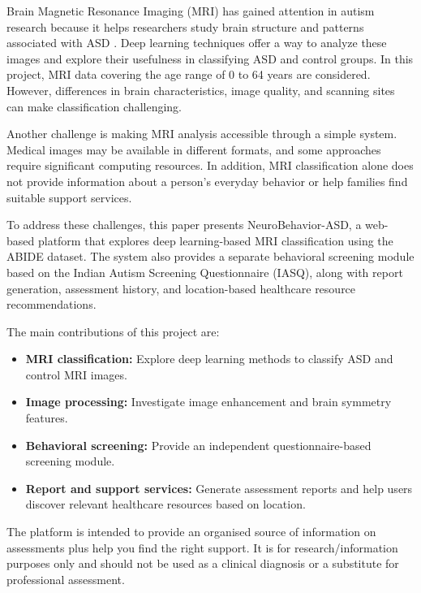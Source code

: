 \documentclass[conference]{IEEEtran}
\begin{document}
Brain Magnetic Resonance Imaging (MRI) has gained attention in autism research because it helps researchers study brain structure and patterns associated with ASD \cite{hasan2025}. Deep learning techniques offer a way to analyze these images and explore their usefulness in classifying ASD and control groups. In this project, MRI data covering the age range of 0 to 64 years are considered. However, differences in brain characteristics, image quality, and scanning sites can make classification challenging.

Another challenge is making MRI analysis accessible through a simple system. Medical images may be available in different formats, and some approaches require significant computing resources. In addition, MRI classification alone does not provide information about a person's everyday behavior or help families find suitable support services.

To address these challenges, this paper presents NeuroBehavior-ASD, a web-based platform that explores deep learning-based MRI classification using the ABIDE dataset. The system also provides a separate behavioral screening module based on the Indian Autism Screening Questionnaire (IASQ), along with report generation, assessment history, and location-based healthcare resource recommendations.

The main contributions of this project are:
\begin{itemize}
    \item \textbf{MRI classification:} Explore deep learning methods to classify ASD and control MRI images.
    \item \textbf{Image processing:} Investigate image enhancement and brain symmetry features.
    \item \textbf{Behavioral screening:} Provide an independent questionnaire-based screening module.
    \item \textbf{Report and support services:} Generate assessment reports and help users discover relevant healthcare resources based on location.
\end{itemize}

The platform is intended to provide an organised source of information on assessments plus help you find the right support. It is for research/information purposes only and should not be used as a clinical diagnosis or a substitute for professional assessment.

\end{document}
